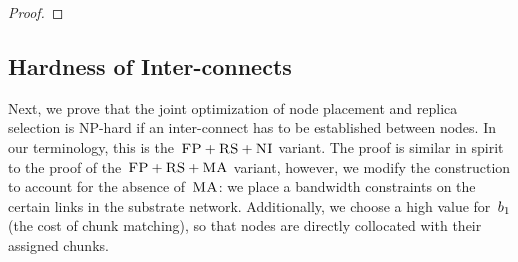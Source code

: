 \begin{proof}


%  
\end{proof}



\subsection{Hardness of Inter-connects}\label{ssec:fprscc}



Next, we prove that the joint optimization of node placement and replica selection
is NP-hard if an inter-connect has to be established between nodes.
In our terminology, this is the~$\textsc{FP}+\textsc{RS}+\textsc{NI}$ variant.
The proof is similar in spirit to the proof of the~$\textsc{FP}+\textsc{RS}+\textsc{MA}$ variant, however,
we modify the construction to account for the absence of~$\textsc{MA}$:
we place a bandwidth constraints on the certain links in the substrate network.
Additionally, we choose
a high value for~$b_1$ (the cost of chunk matching), so that nodes are directly collocated with
their assigned chunks.

